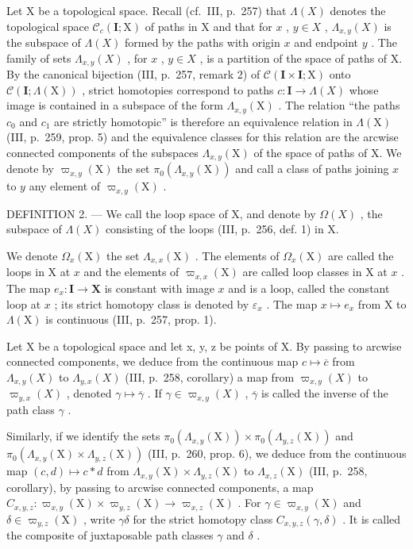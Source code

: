 Let X be a topological space. Recall (cf.~III, p.~257) that \(\Lambda(X)\) denotes the topological space \(\mathcal{C}_c(\mathbf{I};\mathrm{X})\) of paths in X and that for \(x\) , \(y \in X\) , \(\Lambda_{x,y}(X)\) is the subspace of \(\Lambda(X)\) formed by the paths with origin \(x\) and endpoint \(y\) . The family of sets \(\Lambda_{x,y}(X)\) , for \(x\) , \(y \in X\) , is a partition of the space of paths of X. By the canonical bijection (III, p.~257, remark 2) of \(\mathcal{C}(\mathbf{I} \times \mathbf{I};\mathrm{X})\) onto \(\mathcal{C}(\mathbf{I};\Lambda(\mathrm{X}))\) , strict homotopies correspond to paths \(c: \mathbf{I} \to \Lambda(X)\) whose image is contained in a subspace of the form \(\Lambda_{x,y}(\mathrm{X})\) . The relation “the paths \(c_0\) and \(c_1\) are strictly homotopic” is therefore an equivalence relation in \(\Lambda(\mathrm{X})\) (III, p.~259, prop. 5) and the equivalence classes for this relation are the arcwise connected components of the subspaces \(\Lambda_{x,y}(\mathrm{X})\) of the space of paths of X. We denote by \(\varpi_{x,y}(\mathrm{X})\) the set \(\pi_0(\Lambda_{x,y}(\mathrm{X}))\) and call a class of paths joining \(x\) to \(y\) any element of \(\varpi_{x,y}(\mathrm{X})\) .

DEFINITION 2. --- We call the loop space of X, and denote by \(\Omega(X)\) , the subspace of \(\Lambda(X)\) consisting of the loops (III, p.~256, def. 1) in X.

We denote \(\Omega_x(\mathrm{X})\) the set \(\Lambda_{x,x}(\mathrm{X})\) . The elements of \(\Omega_x(\mathrm{X})\) are called the loops in X at \(x\) and the elements of \(\varpi_{x,x}(\mathrm{X})\) are called loop classes in X at \(x\) . The map \(e_x: \mathbf{I} \to \mathbf{X}\) is constant with image \(x\) and is a loop, called the constant loop at \(x\) ; its strict homotopy class is denoted by \(\varepsilon_x\) . The map \(x \mapsto e_x\) from X to \(\Lambda(\mathrm{X})\) is continuous (III, p.~257, prop. 1).

Let X be a topological space and let x, y, z be points of X. By passing to arcwise connected components, we deduce from the continuous map \(c \mapsto \overline{c}\) from \(\Lambda_{x,y}(X)\) to \(\Lambda_{y,x}(X)\) (III, p.~258, corollary) a map from \(\varpi_{x,y}(X)\) to \(\varpi_{y,x}(X)\) , denoted \(\gamma \mapsto \overline{\gamma}\) . If \(\gamma \in \varpi_{x,y}(X)\) , \(\overline{\gamma}\) is called the inverse of the path class \(\gamma\) .

Similarly, if we identify the sets \(\pi_0(\Lambda_{x,y}(\mathrm{X})) \times \pi_0(\Lambda_{y,z}(\mathrm{X}))\) and \(\pi_0(\Lambda_{x,y}(\mathrm{X}) \times \Lambda_{y,z}(\mathrm{X}))\) (III, p.~260, prop. 6), we deduce from the continuous map \((c,d) \mapsto c * d\) from \(\Lambda_{x,y}(\mathrm{X}) \times \Lambda_{y,z}(\mathrm{X})\) to \(\Lambda_{x,z}(\mathrm{X})\) (III, p.~258, corollary), by passing to arcwise connected components, a map \(C_{x,y,z} \colon \varpi_{x,y}(\mathrm{X}) \times \varpi_{y,z}(\mathrm{X}) \to \varpi_{x,z}(\mathrm{X})\) . For \(\gamma \in \varpi_{x,y}(\mathrm{X})\) and \(\delta \in \varpi_{y,z}(\mathrm{X})\) , write \(\gamma \delta\) for the strict homotopy class \(C_{x,y,z}(\gamma,\delta)\) . It is called the composite of juxtaposable path classes \(\gamma\) and \(\delta\) .

